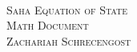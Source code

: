 
\begin{titlepage}

	\begin{center}

		~\\[10cm]
		\textsc{\Large Saha Equation of State} \\
		\textsc{Math Document} \\
		\textsc{Zachariah Schrecengost}

	\end{center}

\end{titlepage}
